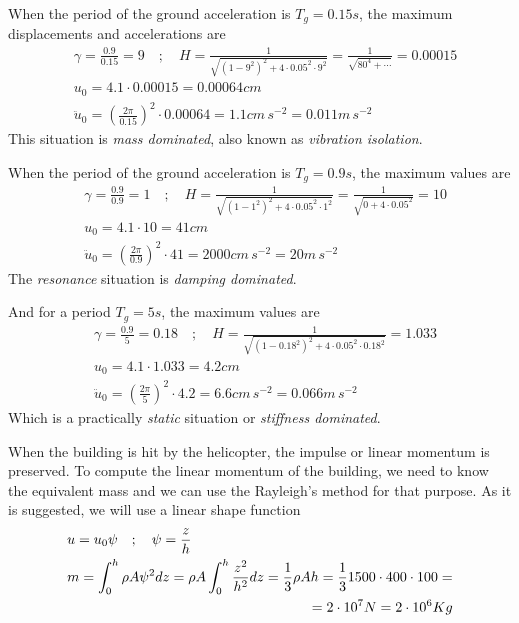 \documentclass{problems}
\begin{document}
When the period of the ground acceleration is $T_g=0.15s$, the maximum displacements and accelerations are
\begin{align*}
&\gamma = \frac{0.9}{0.15} = 9 \quad ; \quad
H = \frac{1}{\sqrt{(1-9^2)^2 + 4\cdot 0.05^2\cdot 9^2}} = \frac{1}{\sqrt{80^4 + \cdots}} = 0.00015 \\
&u_0 = 4.1\cdot 0.00015 = 0.00064 cm \\
&\ddot{u}_0 = \left(\frac{2\pi}{0.15}\right)^2 \cdot 0.00064 = 1.1cm\,s^{-2} = 0.011m\,s^{-2}
\end{align*}
This situation is \emph{mass dominated}, also known as \emph{vibration isolation}.

When the period of the ground acceleration is $T_g=0.9s$, the maximum values are
\begin{align*}
&\gamma = \frac{0.9}{0.9} = 1 \quad ; \quad
H = \frac{1}{\sqrt{(1-1^2)^2 + 4\cdot 0.05^2\cdot 1^2}} = \frac{1}{\sqrt{0 + 4\cdot 0.05^2}} = 10 \\
&u_0 = 4.1\cdot 10 = 41 cm \\
&\ddot{u}_0 = \left(\frac{2\pi}{0.9}\right)^2 \cdot 41 = 2000cm\,s^{-2} = 20m\,s^{-2}
\end{align*}
The \emph{resonance} situation is \emph{damping dominated}.

And for a period $T_g=5s$, the maximum values are
\begin{align*}
&\gamma = \frac{0.9}{5} = 0.18 \quad ; \quad
H = \frac{1}{\sqrt{(1-0.18^2)^2 + 4\cdot 0.05^2\cdot 0.18^2}} = 1.033 \\
&u_0 = 4.1\cdot 1.033 = 4.2 cm \\
&\ddot{u}_0 = \left(\frac{2\pi}{5}\right)^2 \cdot 4.2 = 6.6cm\,s^{-2} = 0.066m\,s^{-2}
\end{align*}
Which is a practically \emph{static} situation or \emph{stiffness dominated}.

When the building is hit by the helicopter, the impulse or linear momentum is preserved. To compute the linear momentum of the building, we need to know the equivalent mass and we can use the Rayleigh's method for that purpose. As it is suggested, we will use a linear shape function
\begin{align*}
&u = u_0\psi \quad ; \quad \psi = \frac{z}{h} \\
&m = \int_0^h \rho A\psi^2dz = \rho A\int_0^h\frac{z^2}{h^2}dz = \frac{1}{3}\rho Ah = \frac{1}{3} 1500 \cdot 400 \cdot 100 = \\
& \pushright{= 2\cdot 10^7N = 2\cdot 10^6Kg}
\end{align*}
\end{document}

